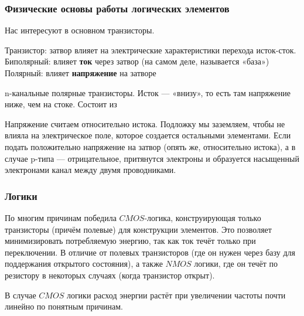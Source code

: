 \documentclass[12pt, a4paper]{article}
\begin{document}
\subsubsection{Физические основы работы логических элементов}

Нас интересуют в основном транзисторы.

Транзистор: затвор влияет на электрические характеристики перехода исток-сток.
Биполярный: влияет \textbf{ток} через затвор (на самом деле, называется «база»)
Полярный: влияет \textbf{напряжение} на затворе

n-канальные полярные транзисторы. Исток — «внизу», то есть там напряжение ниже, чем на стоке. Состоит из 

Напряжение считаем относительно истока. 
Подложку мы заземляем, чтобы не влияла на электрическое поле, которое создается остальными элементами.
Если подать положительно напряжение на затвор (опять же, относительно истока), а в случае p-типа — отрицательное, 
притянутся электроны и образуется насыщенный электронами канал между двумя проводниками.

\subsubsection{Логики}

По многим причинам победила $CMOS$-логика, конструирующая только транзисторы (причём полевые)
для конструкции элементов. Это позволяет минимизировать потребляемую энергию, так как ток течёт только при переключении.
В отличие от полевых транзисторов (где он нужен через базу для поддержания открытого состояния),
а также $NMOS$ логики, где он течёт по резистору в некоторых случаях (когда транзистор открыт).

В случае $CMOS$ логики расход энергии растёт при увеличении частоты почти линейно по понятным причинам.
\end{document}
